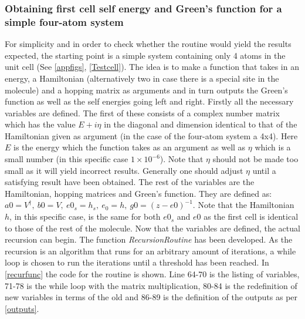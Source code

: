 \subsubsection{Obtaining first cell self energy and Green's function for a simple four-atom system}\label{recursionroutinesec}
For simplicity and in order to check whether the routine would yield the results expected, the starting point is a simple system containing only 4 atoms in the unit cell (See \cref{appfigs}, \cref{Testcell}). The idea is to make a function that takes in an energy, a Hamiltonian (alternatively two in case there is a special site in the molecule) and a hopping matrix as arguments and in turn outputs the Green's function as well as the self energies going left and right. Firstly all the necessary variables are defined. The first of these consists of a complex number matrix which has the value \(E + i\eta\) in the diagonal and dimension identical to that of the Hamiltonian given as argument (in the case of the four-atom system a 4x4). Here \(E\) is the energy which the function takes as an argument as well as \(\eta\) which is a small number (in this specific case \(1\times10^{-6}\)). Note that \(\eta\) should not be made too small as it will yield incorrect results. Generally one should adjust \(\eta\) until a satisfying result have been obtained. The rest of the variables are the Hamiltonian, hopping matrices and Green's function. They are defined as: \(a0 = V^{\dagger}, \ b0 = V, \ e0_{s} = h_s, \ e_{0} = h, \ g0 = (z-e0)^{-1}\). Note that the Hamiltonian \(h\), in this specific case, is the same for both \(e0_{s}\) and \(e0\) as the first cell is identical to those of the rest of the molecule. Now that the variables are defined, the actual recursion can begin. The function \textit{RecursionRoutine} has been developed. As the recursion is an algorithm that runs for an arbitrary amount of iterations, a while loop is chosen to run the iterations until a threshold has been reached. In \cref{recurfunc} the code for the routine is shown. Line 64-70 is the listing of variables, 71-78 is the while loop with the matrix multiplication, 80-84 is the redefinition of new variables in terms of the old and 86-89 is the definition of the outputs as per \cref{outputs}.\\
\newpage
{}
\vspace{-1\baselineskip}
\vspace{\baselineskip}\newpage
